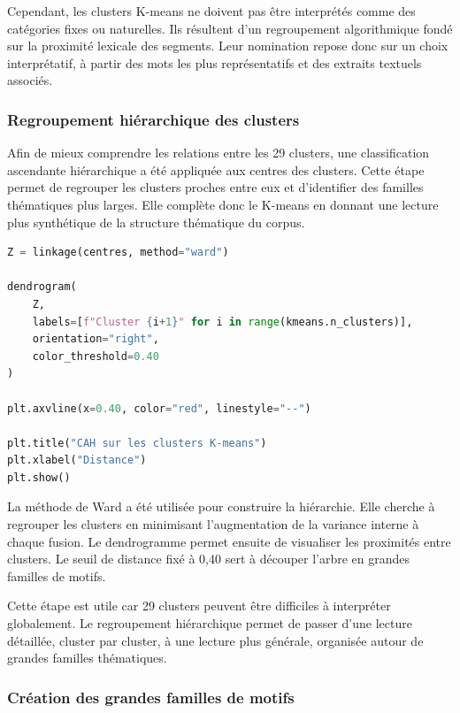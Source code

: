 \documentclass{article}
\begin{document}
Cependant, les clusters K-means ne doivent pas être interprétés comme des catégories fixes ou naturelles. Ils résultent d'un regroupement algorithmique fondé sur la proximité lexicale des segments. Leur nomination repose donc sur un choix interprétatif, à partir des mots les plus représentatifs et des extraits textuels associés.

\subsubsection{Regroupement hiérarchique des clusters}

Afin de mieux comprendre les relations entre les 29 clusters, une classification ascendante hiérarchique a été appliquée aux centres des clusters. Cette étape permet de regrouper les clusters proches entre eux et d'identifier des familles thématiques plus larges. Elle complète donc le K-means en donnant une lecture plus synthétique de la structure thématique du corpus.

\begin{lstlisting}[language=Python, caption={Classification hiérarchique sur les centres des clusters}]
Z = linkage(centres, method="ward")

dendrogram(
    Z,
    labels=[f"Cluster {i+1}" for i in range(kmeans.n_clusters)],
    orientation="right",
    color_threshold=0.40
)

plt.axvline(x=0.40, color="red", linestyle="--")

plt.title("CAH sur les clusters K-means")
plt.xlabel("Distance")
plt.show()
\end{lstlisting}

La méthode de Ward a été utilisée pour construire la hiérarchie. Elle cherche à regrouper les clusters en minimisant l'augmentation de la variance interne à chaque fusion. Le dendrogramme permet ensuite de visualiser les proximités entre clusters. Le seuil de distance fixé à 0,40 sert à découper l'arbre en grandes familles de motifs.

Cette étape est utile car 29 clusters peuvent être difficiles à interpréter globalement. Le regroupement hiérarchique permet de passer d'une lecture détaillée, cluster par cluster, à une lecture plus générale, organisée autour de grandes familles thématiques.

\subsubsection{Création des grandes familles de motifs}
\end{document}
